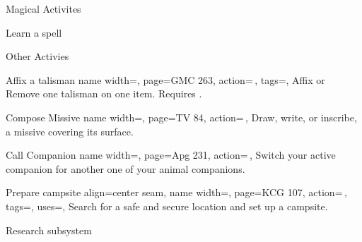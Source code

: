 \begin{PageFront}
\begin{Tables}{\frontTableHeight}
\begin{Table}{Magical Activites}
\begin{entry}{Learn a spell}
                \\
                \hphantom{t}\hfill{}\quad
            \end{entry}
        \end{Table}
        \TableSpace
        \begin{Table}{Other Activies}
            \begin{entry}{Affix a talisman}{%
                name width=\activityLength,%
                page=GMC 263,
                action=\,,
                tags=\Manipulate,
            }
                Affix or Remove one talisman on one item. Requires .\hfill
            \end{entry}
            \begin{entry}{Compose Missive}{%
                name width=\activityLength,%
                page=TV 84,
                action=\,,
            }
                Draw, write, or inscribe, a missive covering its surface.\hfill
            \end{entry}
            \begin{entry}{Call Companion}{%
                name width=\activityLength,%
                page=Apg 231,
                action=\,,
            }
                Switch your active companion for another one of your animal companions.
            \end{entry}
            \begin{entry}{Prepare campsite}{%
                align=center seam,
                name width=\activityLength,%
                page=KCG 107,
                action=\,,
                tags=\Concentrate\Move,
                uses=\Survival,
            }
                Search for a safe and secure location and set up a campsite.\hfill
                \\
                \hfill
                \hfill
            \end{entry}
        \end{Table}
        \TableSpace
        \begin{Table}{Research subsystem}

\end{Table}
\end{Tables}
\end{PageFront}
